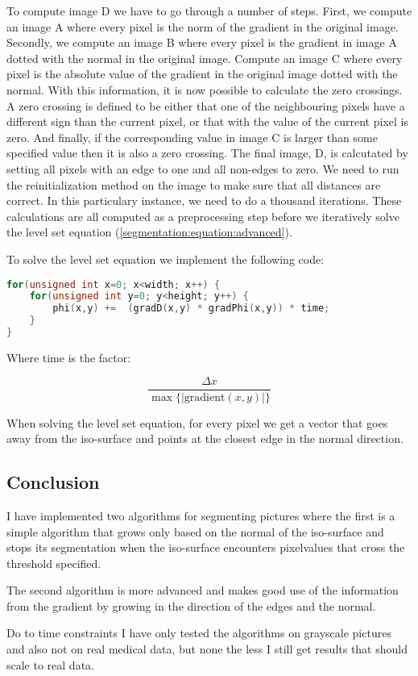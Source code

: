 To compute image D we have to go through a number of steps. First, we compute an image A where every pixel is the norm of the gradient in the original image. Secondly, we compute an image B where every pixel is the gradient in image A dotted with the normal in the original image. Compute an image C where every pixel is the absolute value of the gradient in the original image dotted with the normal.
With this information, it is now possible to calculate the zero crossings. A zero crossing is defined to be either that one of the neighbouring pixels have a different sign than the current pixel, or that with the value of the current pixel is zero. And finally, if the corresponding value in image C is larger than some specified value then it is also a zero crossing. The final image, D, is calcutated by setting all pixels with an edge to one and all non-edges to zero. We need to run the reinitialization method on the image to make sure that all distances are correct. In this particulary instance, we need to do a thousand iterations. These calculations are all computed as a preprocessing step before we iteratively solve the level set equation (\ref{segmentation:equation:advanced}).

To solve the level set equation we implement the following code:
\begin{lstlisting}[language=c++]
for(unsigned int x=0; x<width; x++) {
    for(unsigned int y=0; y<height; y++) {
        phi(x,y) +=  (gradD(x,y) * gradPhi(x,y)) * time;
    }
}
\end{lstlisting}

Where time is the factor:

\begin{equation*}
  \dfrac{\Delta x} {\max \{|\textrm{gradient}(x,y)|\}} 
\end{equation*}

When solving the level set equation, for every pixel we get a vector that goes away from the iso-surface and points at the closest edge in the normal direction.

\subsection{Conclusion}
\label{segmentation:conclusion}

I have implemented two algorithms for segmenting pictures where the first is a simple algorithm that grows only based on the normal of the iso-surface and stops its segmentation when the iso-surface encounters pixelvalues that cross the threshold specified.

The second algorithm is more advanced and makes good use of the information from the gradient by growing in the direction of the edges and the normal.

Do to time constraints I have only tested the algorithms on grayscale pictures and also not on real medical data, but none the less I still get results that should scale to real data.


